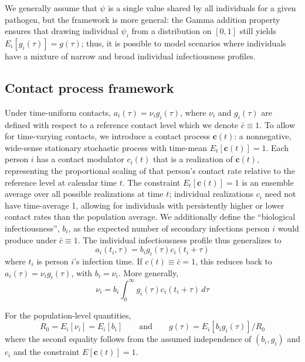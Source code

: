 \documentclass[10pt]{article}
\begin{document}
We generally assume that $\psi$ is a single value shared by all individuals for a given pathogen, but the framework is more general: the Gamma addition property ensures that drawing individual $\psi_i$ from a distribution on $[0,1]$ still yields $E_i[g_i(\tau)] = g(\tau)$; thus, it is possible to model scenarios where individuals have a mixture of narrow and broad individual infectiousness profiles.

\subsection{Contact process framework}
\label{sec:supp_contacts}

Under time-uniform contacts, $a_i(\tau) = \nu_i g_i(\tau)$, where $\nu_i$ and $g_i(\tau)$ are defined with respect to a reference contact level which we denote $\bar{c} \equiv 1$. To allow for time-varying contacts, we introduce a contact process $\mathbf{c}(t)$: a nonnegative, wide-sense stationary stochastic process with time-mean $E_t[\mathbf{c}(t)] = 1$. Each person $i$ has a contact modulator $c_i(t)$ that is a realization of $\mathbf{c}(t)$, representing the proportional scaling of that person's contact rate relative to the reference level at calendar time $t$. The constraint $E_t[\mathbf{c}(t)] = 1$ is an ensemble average over all possible realizations at time $t$; individual realizations $c_i$ need not have time-average 1, allowing for individuals with persistently higher or lower contact rates than the population average. We additionally define the ``biological infectiousness'', $b_i$, as the expected number of secondary infections person $i$ would produce under $\bar{c} \equiv 1$. The individual infectiousness profile thus generalizes to
%
\begin{equation}
	a_i(t_i, \tau) = b_i g_i(\tau) c_i(t_i + \tau)
	\label{eq:abc}
\end{equation}
%
where $t_i$ is person $i$'s infection time. If $c(t) \equiv \bar{c} = 1$, this reduces back to $a_i(\tau) = \nu_i g_i(\tau)$, with $b_i = \nu_i$. More generally,
%
\begin{equation}
	\nu_i = b_i \int_0^\infty g_i(\tau) c_i(t_i+\tau) \, d\tau
	\label{eq:nu_general}
\end{equation}

For the population-level quantities,
\begin{equation}
	R_0 = E_i[\nu_i] = E_i[b_i] \qquad \text{and} \qquad g(\tau) = E_i[b_i g_i(\tau)] / R_0
\end{equation}
where the second equality follows from the assumed independence of $(b_i, g_i)$ and $c_i$ and the constraint $E[\mathbf{c}(t)] = 1$.
\end{document}

